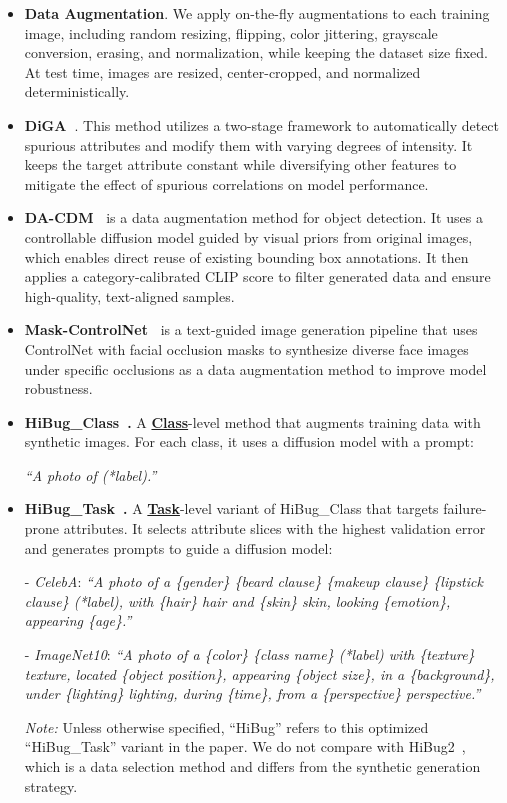 \documentclass[10pt]{article} %
\newcommand{\hibug}{HiBug\xspace}
\begin{document}
\begin{itemize}
\item \textbf{Data Augmentation}. We apply on-the-fly augmentations to each training image, including random resizing, flipping, color jittering, grayscale conversion, erasing, and normalization, while keeping the dataset size fixed. At test time, images are resized, center-cropped, and normalized deterministically.

\item \textbf{DiGA~\citep{zhang2024distributionally}}. This method utilizes a two-stage framework to automatically detect spurious attributes and modify them with varying degrees of intensity. It keeps the target attribute constant while diversifying other features to mitigate the effect of spurious correlations on model performance.


\item \textbf{DA-CDM~\citep{fang2024data}} is a data augmentation method for object detection. It uses a controllable diffusion model guided by visual priors from original images, which enables direct reuse of existing bounding box annotations. It then applies a category-calibrated CLIP score to filter generated data and ensure high-quality, text-aligned samples.
\item \textbf{Mask-ControlNet~\citep{huang2024data}} is a text-guided image generation pipeline that uses ControlNet with facial occlusion masks to synthesize diverse face images under specific occlusions as a data augmentation method to improve model robustness.

    \item \textbf{HiBug\_Class~\citep{chen2023hibug}.}  
    A \underline{\textbf{Class}}-level method that augments training data with synthetic images. For each class, it uses a diffusion model with a prompt:

    \textit{``A photo of (*label).''}

    \item \textbf{HiBug\_Task~\citep{chen2023hibug}.}  
    A \underline{\textbf{Task}}-level variant of HiBug\_Class that targets failure-prone attributes. It selects attribute slices with the highest validation error and generates prompts to guide a diffusion model:

    - \textit{CelebA}:  
    \textit{``A photo of a \{gender\} \{beard clause\} \{makeup clause\} \{lipstick clause\} (*label), with \{hair\} hair and \{skin\} skin, looking \{emotion\}, appearing \{age\}.''}

    - \textit{ImageNet10}:  
    \textit{``A photo of a \{color\} \{class name\} (*label) with \{texture\} texture, located \{object position\}, appearing \{object size\}, in a \{background\}, under \{lighting\} lighting, during \{time\}, from a \{perspective\} perspective.''}

    \textit{Note:} Unless otherwise specified, ``\hibug'' refers to this optimized ``HiBug\_Task'' variant in the paper. We do not compare with HiBug2~\citep{chen2025hibug2}, which is a data selection method and differs from the synthetic generation strategy.

\end{itemize}
\end{document}
